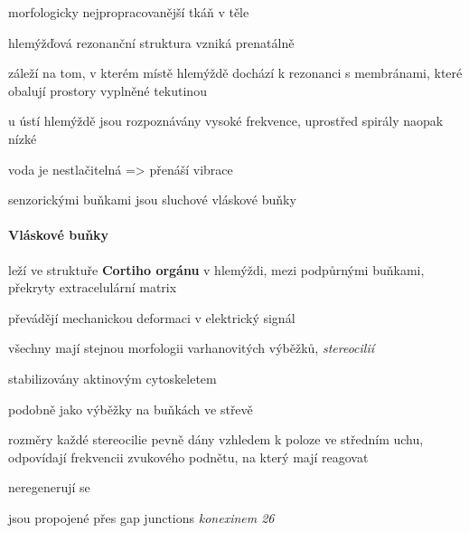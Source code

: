 \documentclass[DIV=8]{scrreprt}
\begin{document}
\begin{myItemize}[nosep]
    \item morfologicky nejpropracovanější tkáň v těle
    \item hlemýžďová rezonanční struktura vzniká prenatálně
    \item záleží na tom, v kterém místě hlemýždě dochází k rezonanci s membránami, které obalují prostory vyplněné tekutinou
\begin{myItemize}[nosep]
    \item u ústí hlemýždě jsou rozpoznávány vysoké frekvence, uprostřed spirály naopak nízké
    \item voda je nestlačitelná => přenáší vibrace
\end{myItemize}

    \item senzorickými buňkami jsou sluchové vláskové buňky
\end{myItemize}



\paragraph{Vláskové buňky}
\begin{myItemize}[nosep]
    \item leží ve struktuře \textbf{Cortiho orgánu} v hlemýždi, mezi podpůrnými buňkami, překryty extracelulární matrix
    \item převádějí mechanickou deformaci v elektrický signál
    \item všechny mají stejnou morfologii varhanovitých výběžků, \emph{stereocilií}
\begin{myItemize}[nosep]
    \item stabilizovány aktinovým cytoskeletem
    \item podobně jako výběžky na buňkách ve střevě
    \item rozměry každé stereocilie pevně dány vzhledem k poloze ve středním uchu, odpovídají frekvencii zvukového podnětu, na který mají reagovat
\end{myItemize}

    \item neregenerují se
    \item jsou propojené přes gap junctions \emph{konexinem 26}
\end{myItemize}
\end{document}
